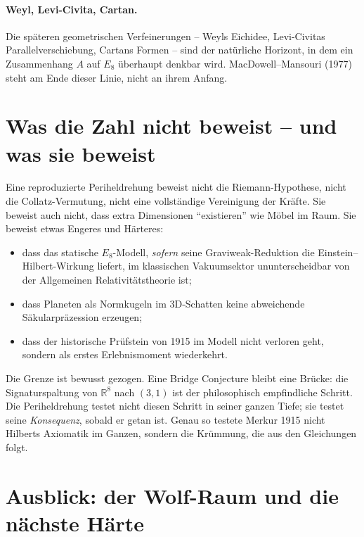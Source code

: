 \documentclass[11pt,a4paper]{article}
\theoremstyle{definition}
\theoremstyle{remark}
\begin{document}
\paragraph{Weyl, Levi-Civita, Cartan.}
Die späteren geometrischen Verfeinerungen -- Weyls Eichidee, Levi-Civitas Parallelverschiebung, Cartans Formen -- sind der natürliche Horizont, in dem ein Zusammenhang \(A\) auf \(E_8\) überhaupt denkbar wird. MacDowell--Mansouri (1977) steht am Ende dieser Linie, nicht an ihrem Anfang.

\section{Was die Zahl nicht beweist -- und was sie beweist}

Eine reproduzierte Periheldrehung beweist nicht die Riemann-Hypothese, nicht die Collatz-Vermutung, nicht eine vollständige Vereinigung der Kräfte. Sie beweist auch nicht, dass extra Dimensionen \enquote{existieren} wie Möbel im Raum. Sie beweist etwas Engeres und Härteres:

\begin{itemize}
  \item dass das statische \(E_8\)-Modell, \emph{sofern} seine Graviweak-Reduktion die Einstein--Hilbert-Wirkung liefert, im klassischen Vakuumsektor ununterscheidbar von der Allgemeinen Relativitätstheorie ist;
  \item dass Planeten als Normkugeln im 3D-Schatten keine abweichende Säkularpräzession erzeugen;
  \item dass der historische Prüfstein von 1915 im Modell nicht verloren geht, sondern als erstes Erlebnismoment wiederkehrt.
\end{itemize}

Die Grenze ist bewusst gezogen. Eine Bridge Conjecture bleibt eine Brücke: die Signaturspaltung von \(\mathbb{R}^8\) nach \((3,1)\) ist der philosophisch empfindliche Schritt. Die Periheldrehung testet nicht diesen Schritt in seiner ganzen Tiefe; sie testet seine \emph{Konsequenz}, sobald er getan ist. Genau so testete Merkur 1915 nicht Hilberts Axiomatik im Ganzen, sondern die Krümmung, die aus den Gleichungen folgt.

\section{Ausblick: der Wolf-Raum und die nächste Härte}
\end{document}
